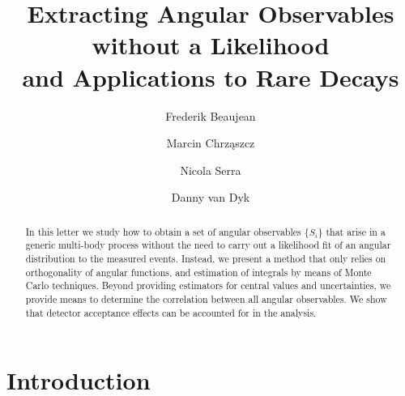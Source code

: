 \documentclass[aps,prd,reprint,nofootinbib,preprintnumbers]{revtex4}
\begin{document}
\allowdisplaybreaks

\title{Extracting Angular Observables without a Likelihood\\and Applications to Rare Decays}
\author{Frederik Beaujean}
\author{Marcin Chrz\k{a}szcz}
\author{Nicola Serra}
\author{Danny van Dyk}

\begin{abstract}
In this letter we study how to obtain a set of angular observables
$\{S_i\}$ that arise in a generic multi-body process without the need
to carry out a likelihood fit of an angular distribution to the
measured events. Instead, we present a method that only relies on
orthogonality of angular functions, and estimation of integrals
by means of Monte Carlo techniques. Beyond providing estimators
for central values and uncertainties, we provide means to determine
the correlation between all angular observables. We show that detector
acceptance effects can be accounted for in the analysis.
\end{abstract}

\maketitle

\section{Introduction}
\label{sec:intro}
\end{document}

